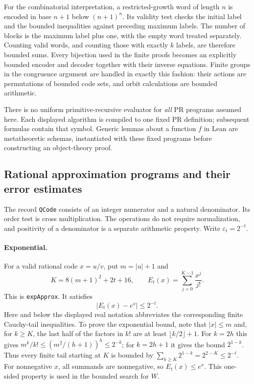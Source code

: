 For the combinatorial interpretation, a restricted-growth word of length
$n$ is encoded in base $n+1$ below $(n+1)^n$. Its validity test checks the
initial label and the bounded inequalities against preceding maximum
labels. The number of blocks is the maximum label plus one, with the empty
word treated separately. Counting valid words, and counting those with
exactly $k$ labels, are therefore bounded sums. Every bijection used in the
finite proofs becomes an explicitly bounded encoder and decoder together
with their inverse equations. Finite groups in the congruence argument are
handled in exactly this fashion: their actions are permutations of bounded
code sets, and orbit calculations are bounded arithmetic.

There is no uniform primitive-recursive evaluator for \emph{all} PR
programs assumed here. Each displayed algorithm is compiled to one fixed
PR definition; subsequent formulas contain that symbol. Generic lemmas
about a function $f$ in Lean are metatheoretic schemas, instantiated with
these fixed programs before constructing an object-theory proof.

\subsection{Rational approximation programs and their error estimates}
\label{subsec:lean-approximation}

The record \texttt{QCode} consists of an integer numerator and a natural
denominator. Its order test is cross multiplication. The operations do not
require normalization, and positivity of a denominator is a separate
arithmetic property. Write $\varepsilon_t=2^{-t}$.

\paragraph{Exponential.}
For a valid rational code $x=u/v$, put $m=|u|+1$ and
\[
 K=8(m+1)^2+2t+16,\qquad
 E_t(x)=\sum_{j=0}^{K-1}\frac{x^j}{j!}.
\]
This is \texttt{expApprox}. It satisfies
\[
 |E_t(x)-e^x|\le 2^{-t}.
\]
Here and below the displayed real notation abbreviates the corresponding
finite Cauchy-tail inequalities. To prove the exponential bound, note that
$|x|\le m$ and, for $k\ge K$, the last half of the factors in $k!$ are at
least $\lfloor k/2\rfloor+1$. For $k=2h$ this gives
$m^k/k!\le(m^2/(h+1))^h\le 2^{-k}$; for $k=2h+1$ it gives the bound
$2^{1-k}$. Thus every finite tail starting at $K$ is bounded by
$\sum_{k\ge K}2^{1-k}=2^{2-K}\le2^{-t}$.
For nonnegative $x$, all summands are nonnegative, so $E_t(x)\le e^x$.
This one-sided property is used in the bounded search for $W$.

